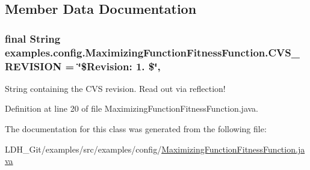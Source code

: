 \subsection{Member Data Documentation}
\hypertarget{classexamples_1_1config_1_1_maximizing_function_fitness_function_a655cf371ef85ddd61b8c59272564fbe3}{
\subsubsection[{C\-V\-S\-\_\-\-R\-E\-V\-I\-S\-I\-O\-N}]{\setlength{\rightskip}{0pt plus 5cm}final String examples.\-config.\-Maximizing\-Function\-Fitness\-Function.\-C\-V\-S\-\_\-\-R\-E\-V\-I\-S\-I\-O\-N = \char`\"{}\$Revision\-: 1. \$\char`\"{}\hspace{0.3cm}{\ttfamily [static]}, {\ttfamily [private]}}}\label{classexamples_1_1config_1_1_maximizing_function_fitness_function_a655cf371ef85ddd61b8c59272564fbe3}
String containing the C\-V\-S revision. Read out via reflection! 

Definition at line 20 of file Maximizing\-Function\-Fitness\-Function.\-java.



The documentation for this class was generated from the following file\-:\begin{DoxyCompactItemize}
\item 
L\-D\-H\-\_\-\-Git/examples/src/examples/config/\hyperlink{_maximizing_function_fitness_function_8java}{Maximizing\-Function\-Fitness\-Function.\-java}\end{DoxyCompactItemize}
